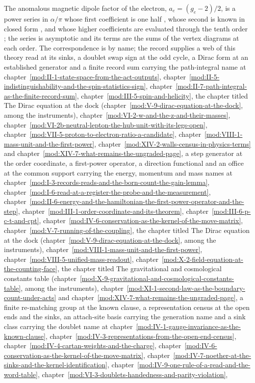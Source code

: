 \begin{chbridge}
The anomalous magnetic dipole factor of the electron, $a_{e} = (g_{e} - 2)/2$, is a power series in $\alpha/\pi$ whose first coefficient is one half \cite{Schwinger1948}, whose second is known in closed form \cite{Petermann1957}, and whose higher coefficients are evaluated through the tenth order \cite{Aoyama2018}; the series is asymptotic and its terms are the sums of the vertex diagrams at each order. The correspondence is by name; the record supplies a web of this theory read at its sinks, a doublet swap sign at the odd cycle, a Dirac form at an established generator and a finite record sum carrying the path-integral name at chapter~\ref{mod:II-1-state-space-from-the-act-outputs}, chapter~\ref{mod:II-5-indistinguishability-and-the-spin-statistics-sign}, chapter~\ref{mod:II-7-path-integral-as-the-finite-record-sum}, chapter~\ref{mod:III-5-spin-and-helicity}, the chapter titled The Dirac equation at the dock (chapter~\ref{mod:V-9-dirac-equation-at-the-dock}, among the instruments), chapter~\ref{mod:VI-2-w-and-the-z-and-their-masses}, chapter~\ref{mod:VI-2b-neutral-lepton-the-hub-unit-with-its-legs-open}, chapter~\ref{mod:VII-5-proton-to-electron-ratio-a-candidate}, chapter~\ref{mod:VIII-1-mass-unit-and-the-first-power}, chapter~\ref{mod:XIV-2-walls-census-in-physics-terms} and chapter~\ref{mod:XIV-7-what-remains-the-ungraded-page}, a step generator at the order coordinate, a first-power operator, a direction functional and an office at the common support carrying the energy, momentum and mass names at chapter~\ref{mod:I-3-records-reads-and-the-born-count-the-gain-lemma}, chapter~\ref{mod:I-6-read-at-a-register-the-probe-and-the-measurement}, chapter~\ref{mod:II-6-energy-and-the-hamiltonian-the-first-power-operator-and-the-step}, chapter~\ref{mod:III-1-order-coordinate-and-its-theorem}, chapter~\ref{mod:III-6-p-c-t-and-cpt}, chapter~\ref{mod:IV-6-conservation-as-the-kernel-of-the-move-matrix}, chapter~\ref{mod:V-7-running-of-the-coupling}, the chapter titled The Dirac equation at the dock (chapter~\ref{mod:V-9-dirac-equation-at-the-dock}, among the instruments), chapter~\ref{mod:VIII-1-mass-unit-and-the-first-power}, chapter~\ref{mod:VIII-5-unified-mass-readout}, chapter~\ref{mod:X-2-field-equation-at-the-counting-face}, the chapter titled The gravitational and cosmological constants table (chapter~\ref{mod:X-9-gravitational-and-cosmological-constants-table}, among the instruments), chapter~\ref{mod:XI-1-second-law-as-the-boundary-count-under-acts} and chapter~\ref{mod:XIV-7-what-remains-the-ungraded-page}, a finite re-matching group at the known clause, a representation census at the open ends and the sinks, an attach-site basis carrying the generation name and a sink class carrying the doublet name at chapter~\ref{mod:IV-1-gauge-invariance-as-the-known-clause}, chapter~\ref{mod:IV-3-representations-from-the-open-end-census}, chapter~\ref{mod:IV-4-cartan-weights-and-the-charge}, chapter~\ref{mod:IV-6-conservation-as-the-kernel-of-the-move-matrix}, chapter~\ref{mod:IV-7-noether-at-the-sinks-and-the-kernel-identification}, chapter~\ref{mod:IV-9-one-rule-of-a-read-and-the-word-table}, chapter~\ref{mod:VI-3-doublets-handedness-and-parity-violation}, 
\end{chbridge}
